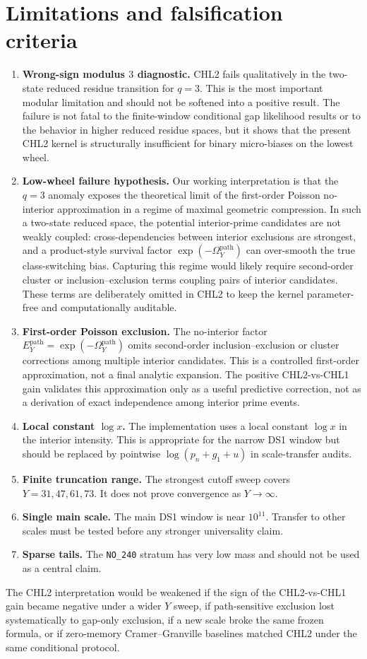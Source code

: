\documentclass[10pt]{article}
\newcommand{\Epath}{E_Y^{\mathrm{path}}}
\newcommand{\Omegapath}{\Omega_Y^{\mathrm{path}}}
\begin{document}
\section{Limitations and falsification criteria}
\begin{enumerate}
\item \textbf{Wrong-sign modulus $3$ diagnostic.} CHL2 fails qualitatively in the two-state reduced residue transition for $q=3$. This is the most important modular limitation and should not be softened into a positive result. The failure is not fatal to the finite-window conditional gap likelihood results or to the behavior in higher reduced residue spaces, but it shows that the present CHL2 kernel is structurally insufficient for binary micro-biases on the lowest wheel.

\item \textbf{Low-wheel failure hypothesis.} Our working interpretation is that the $q=3$ anomaly exposes the theoretical limit of the first-order Poisson no-interior approximation in a regime of maximal geometric compression. In such a two-state reduced space, the potential interior-prime candidates are not weakly coupled: cross-dependencies between interior exclusions are strongest, and a product-style survival factor $\exp(-\Omegapath)$ can over-smooth the true class-switching bias. Capturing this regime would likely require second-order cluster or inclusion--exclusion terms coupling pairs of interior candidates. These terms are deliberately omitted in CHL2 to keep the kernel parameter-free and computationally auditable.

\item \textbf{First-order Poisson exclusion.} The no-interior factor $\Epath=\exp(-\Omegapath)$ omits second-order inclusion--exclusion or cluster corrections among multiple interior candidates. This is a controlled first-order approximation, not a final analytic expansion. The positive CHL2-vs-CHL1 gain validates this approximation only as a useful predictive correction, not as a derivation of exact independence among interior prime events.
\item \textbf{Local constant $\log x$.} The implementation uses a local constant $\log x$ in the interior intensity. This is appropriate for the narrow DS1 window but should be replaced by pointwise $\log(p_n+g_1+u)$ in scale-transfer audits.
\item \textbf{Finite truncation range.} The strongest cutoff sweep covers $Y=31,47,61,73$. It does not prove convergence as $Y\to\infty$.
\item \textbf{Single main scale.} The main DS1 window is near $10^{11}$. Transfer to other scales must be tested before any stronger universality claim.
\item \textbf{Sparse tails.} The \texttt{NO\_240} stratum has very low mass and should not be used as a central claim.
\end{enumerate}
The CHL2 interpretation would be weakened if the sign of the CHL2-vs-CHL1 gain became negative under a wider $Y$ sweep, if path-sensitive exclusion lost systematically to gap-only exclusion, if a new scale broke the same frozen formula, or if zero-memory Cramer--Granville baselines matched CHL2 under the same conditional protocol.
\end{document}
